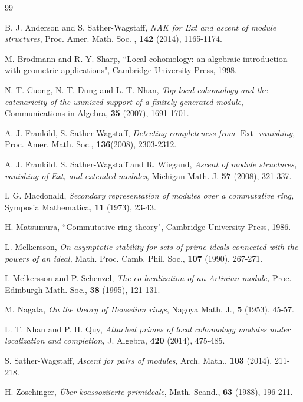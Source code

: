 \documentclass[a4papersize]{article}
\DeclareMathOperator{\Ext}{Ext}
\begin{document}
\begin{thebibliography}{99}

 B. J. Anderson and S. Sather-Wagstaff, {\it NAK for Ext and ascent of module structures}, Proc. Amer. Math. Soc. , {\bf 142}  (2014), 1165-1174.

 M.  Brodmann   and  R. Y.  Sharp, ``Local cohomology: an algebraic introduction with geometric applications",  Cambridge University Press, 1998.

 N. T. Cuong, N. T. Dung and  L. T. Nhan,  {\it Top local cohomology  and the catenaricity of the unmixed support of a finitely generated module}, Communications in  Algebra, {\bf 35}  (2007), 1691-1701.

 A. J. Frankild, S. Sather-Wagstaff,  {\it Detecting completeness from $\Ext$-vanishing}, Proc. Amer. Math. Soc., {\bf 136}(2008), 2303-2312.

  A. J. Frankild, S. Sather-Wagstaff and R. Wiegand,  {\it Ascent of module structures, vanishing of Ext, and extended modules}, Michigan Math. J. {\bf 57}  (2008), 321-337.

   I. G. Macdonald, {\it  Secondary representation of modules  over a commutative ring,}  Symposia Mathematica, {\bf 11}  (1973), 23-43.

 H.  Matsumura, ``Commutative ring theory",  Cambridge University Press, 1986.

   L. Melkersson, {\it On asymptotic stability for sets of prime ideals connected with the
powers of an ideal,} Math. Proc. Camb. Phil. Soc., {\bf 107} (1990), 267-271.

 L Melkersson and P. Schenzel, {\it The co-localization of an Artinian module,} Proc. Edinburgh Math. Soc., {\bf 38} (1995), 121-131.

 M. Nagata, {\it On the theory of Henselian rings}, Nagoya Math. J., {\bf 5} (1953), 45-57. 

  L. T. Nhan and P. H. Quy,  {\it Attached primes of local cohomology modules under localization and completion,}  J. Algebra, {\bf 420}  (2014), 475-485.


  S. Sather-Wagstaff,  {\it Ascent for pairs of modules}, Arch. Math., {\bf 103}  (2014), 211-218.
  

    H. Z\"{o}schinger, {\it \"{U}ber koassoziierte primideale}, Math. Scand., {\bf 63} (1988), 196-211.
 \end{thebibliography}
\end{document}
